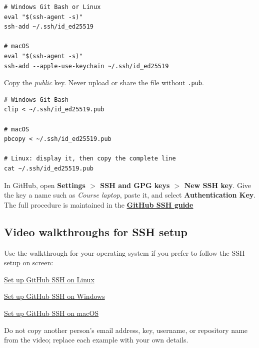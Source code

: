 \begin{lstlisting}[style=mlterminal]
# Windows Git Bash or Linux
eval "$(ssh-agent -s)"
ssh-add ~/.ssh/id_ed25519

# macOS
eval "$(ssh-agent -s)"
ssh-add --apple-use-keychain ~/.ssh/id_ed25519
\end{lstlisting}

Copy the \emph{public} key. Never upload or share the file without
\texttt{.pub}.

\begin{lstlisting}[style=mlterminal]
# Windows Git Bash
clip < ~/.ssh/id_ed25519.pub

# macOS
pbcopy < ~/.ssh/id_ed25519.pub

# Linux: display it, then copy the complete line
cat ~/.ssh/id_ed25519.pub
\end{lstlisting}

In GitHub, open \textbf{Settings $>$ SSH and GPG keys $>$ New SSH key}. Give the
key a name such as \emph{Course laptop}, paste it, and select
\textbf{Authentication Key}. The full procedure is maintained in the
\href{https://docs.github.com/en/authentication/connecting-to-github-with-ssh}{\textbf{GitHub SSH guide}}

\subsection{Video walkthroughs for SSH setup}

Use the walkthrough for your operating system if you prefer to follow the SSH
setup on screen:

\begin{tcolorbox}[
  enhanced,
  breakable,
  colback=UTPPaleOrange,
  colframe=UTPOrange,
  colbacktitle=UTPOrange,
  boxrule=1pt,
  arc=2mm,
  title={Choose your operating system},
  fonttitle=\bfseries\color{white},
  left=3mm,right=3mm,top=2mm,bottom=2mm
]
\begin{description}[leftmargin=1.15in,style=nextline]
  \item[Linux]
    \href{https://youtu.be/AOM8CEyu3Ug?t=121}{Set up GitHub SSH on Linux}
  \item[Windows]
    \href{https://youtu.be/YT5YimhyX18?t=5}{Set up GitHub SSH on Windows}
  \item[macOS]
    \href{https://youtu.be/ACvE5Uy7ZB0?t=437}{Set up GitHub SSH on macOS}
\end{description}
\end{tcolorbox}

Do not copy another person's email address, key, username, or repository name from the video; replace each example with your own details.


